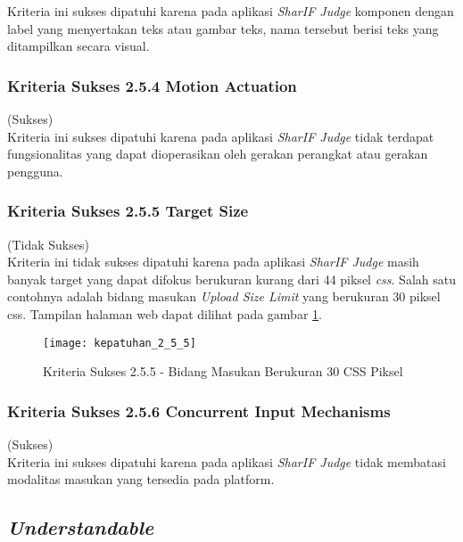 Kriteria ini sukses dipatuhi karena pada aplikasi \textit{SharIF Judge} komponen dengan label yang menyertakan teks atau gambar teks, nama tersebut berisi teks yang ditampilkan secara visual.

\subsubsection{Kriteria Sukses 2.5.4 Motion Actuation}
\label{subsubsec:kepatuhan_kriteria_2.5.4}
(Sukses) \\

Kriteria ini sukses dipatuhi karena pada aplikasi \textit{SharIF Judge} tidak terdapat fungsionalitas yang dapat dioperasikan oleh gerakan perangkat atau gerakan pengguna.

\subsubsection{Kriteria Sukses 2.5.5 Target Size}
\label{subsubsec:kepatuhan_kriteria_2.5.5}
(Tidak Sukses) \\

Kriteria ini tidak sukses dipatuhi karena pada aplikasi \textit{SharIF Judge} masih banyak target yang dapat difokus berukuran kurang dari 44 piksel \textit{css}. Salah satu contohnya adalah bidang masukan \textit{Upload Size Limit} yang berukuran 30 piksel css. Tampilan halaman web dapat dilihat pada gambar \ref{fig:kepatuhan_2_5_5}.

\begin{figure}[H]
	\centering  
	\texttt{[image: kepatuhan\_2\_5\_5]}  
	\caption[Kriteria Sukses 2.5.5 - Bidang Masukan Berukuran 30 CSS Piksel]{Kriteria Sukses 2.5.5 - Bidang Masukan Berukuran 30 CSS Piksel} 
	\label{fig:kepatuhan_2_5_5} 
\end{figure}

\subsubsection{Kriteria Sukses 2.5.6 Concurrent Input Mechanisms}
\label{subsubsec:kepatuhan_kriteria_2.5.6}
(Sukses) \\

Kriteria ini sukses dipatuhi karena pada aplikasi \textit{SharIF Judge} tidak membatasi modalitas masukan yang tersedia pada platform.

\subsection{\textit{Understandable}}
\label{subsec:kepatuhan_understandable}

